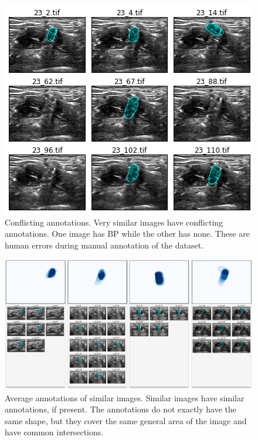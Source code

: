\documentclass{article}
\begin{document}
\begin{figure}[h]
 \centering
  \includegraphics[width=1.0\linewidth]{figures/conflicting.png}
  \caption{
      Conflicting annotations. Very similar images have conflicting annotations. One image has BP while the other has none. These are human errors during manual annotation of the dataset.
  }
  \label{fig:conflicting}
\end{figure}


\begin{figure}[h]
 \centering
  \includegraphics[width=1.0\linewidth]{figures/average_loc.png}
  \caption{
      Average annotations of similar images. Similar images have similar annotations, if present. The annotations do not exactly have the same shape, but they cover the same general area of the image and have common intersections.
  }
  \label{fig:average_loc}
\end{figure}
\end{document}
